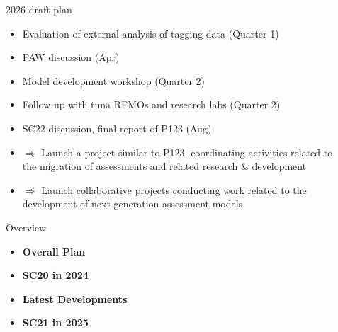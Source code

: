 \documentclass[aspectratio=169,fleqn]{beamer}
\begin{document}
\begin{frame}{2026 draft plan}
  \begin{itemize}
    \item[] Evaluation of external analysis of tagging data (Quarter 1)\\[2ex]
    \item[] PAW discussion (Apr)\\[2ex]
    \item[] Model development workshop (Quarter 2)\\[2ex]
    \item[] Follow up with tuna RFMOs and research labs (Quarter 2)\\[2ex]
    \item[] SC22 discussion, final report of P123 (Aug)\\[2ex]
    \item[] $\Rightarrow$ Launch a project similar to P123, {\green
      coordinating} activities related to\\
    \phantom{$\Rightarrow$} the migration of assessments and related research \&
    development\\[2ex]
    \item[] $\Rightarrow$ Launch collaborative projects {\green conducting} work
    related to the\\
    \phantom{$\Rightarrow$} development of next-generation assessment
    models\\[2ex]
  \end{itemize}
\end{frame}


\begin{frame}{Overview}
  \begin{itemize}
    \item[] {\bf\darkblue Overall Plan} \\[5ex]
    \item[] {\bf\darkblue SC20 in 2024} \\[5ex]
    \item[] {\bf\darkblue Latest Developments} \\[5ex]
    \item[] {\bf\darkblue SC21 in 2025} \\[1ex]
  \end{itemize}
\end{frame}
\end{document}
